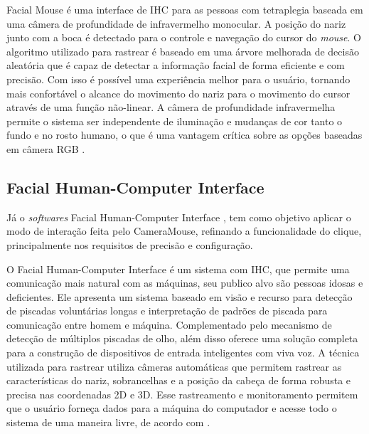 Facial Mouse é uma interface de IHC para as pessoas com tetraplegia baseada em uma câmera de profundidade de infravermelho monocular. A posição do nariz junto com a boca é detectado para o controle e navegação do cursor do \textit{mouse}. O algoritmo utilizado para rastrear é baseado em uma árvore melhorada de decisão aleatória que é capaz de detectar a informação facial de forma eficiente e com precisão. Com isso é possível uma experiência melhor para o usuário, tornando mais confortável o alcance do movimento do nariz para o movimento do cursor através de uma função não-linear. A câmera de profundidade infravermelha permite o sistema ser independente de iluminação e mudanças de cor tanto o fundo e no rosto humano, o que é uma vantagem crítica sobre as opções baseadas em câmera RGB .

\subsection{Facial Human-Computer Interface}

Já o \textit{softwares} Facial Human-Computer Interface , tem como objetivo aplicar o modo de interação feita pelo CameraMouse, refinando a funcionalidade do clique, principalmente nos requisitos de precisão e configuração.

O Facial Human-Computer Interface é um sistema com IHC, que permite uma comunicação mais natural com as máquinas, seu publico alvo são pessoas idosas e deficientes. Ele apresenta um sistema baseado em visão e recurso para detecção de piscadas voluntárias longas e interpretação de padrões de piscada para comunicação entre homem e máquina. Complementado pelo mecanismo de detecção de múltiplos piscadas de olho, além disso oferece uma solução completa para a construção de dispositivos de entrada inteligentes com viva voz. A técnica utilizada para rastrear utiliza câmeras automáticas que permitem rastrear as características do nariz, sobrancelhas e a posição da cabeça de forma robusta e precisa nas coordenadas 2D e 3D. Esse rastreamento e monitoramento permitem que o usuário forneça dados para a máquina do computador e acesse todo o sistema de uma maneira livre, de acordo com . 





